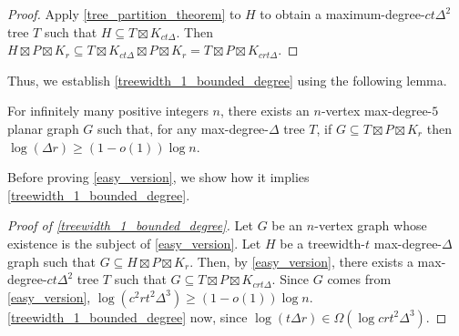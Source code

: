 \documentclass{patmorin}
\begin{document}
\begin{proof}
  Apply \cref{tree_partition_theorem} to $H$ to obtain a maximum-degree-$ct\Delta^2$ tree $T$ such that $H\subseteq T\boxtimes K_{ct\Delta}$.  Then $H\boxtimes P\boxtimes K_{r} \subseteq T\boxtimes K_{ct\Delta}\boxtimes P\boxtimes K_r=T\boxtimes P\boxtimes K_{crt\Delta}$.
\end{proof}

Thus, we establish \cref{treewidth_1_bounded_degree} using the following lemma.

\begin{lem}\label{easy_version}
  For infinitely many positive integers $n$, there exists an $n$-vertex max-degree-$5$ planar graph $G$ such that, for any max-degree-$\Delta$ tree $T$, if $G\subseteq T\boxtimes P\boxtimes K_r$ then $\log (\Delta r)\ge (1-o(1))\log n$.
\end{lem}

Before proving \cref{easy_version}, we show how it implies \cref{treewidth_1_bounded_degree}.

\begin{proof}[Proof of \cref{treewidth_1_bounded_degree}]
  Let $G$ be an $n$-vertex graph whose existence is the subject of \cref{easy_version}.  Let $H$ be a treewidth-$t$ max-degree-$\Delta$ graph such that $G\subseteq H\boxtimes P\boxtimes K_r$.  Then, by \cref{easy_version}, there exists a max-degree-$ct\Delta^2$ tree $T$ such that $G\subseteq T\boxtimes P\boxtimes K_{crt\Delta}$.  Since $G$ comes from \cref{easy_version}, $\log(c^2rt^2\Delta^3)\ge (1-o(1))\log n$. \cref{treewidth_1_bounded_degree} now, since $\log(t\Delta r)\in\Omega(\log crt^2\Delta^3)$.
\end{proof}
\end{document}
